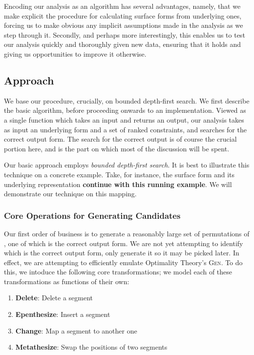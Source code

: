 \documentclass[12pt]{article}
\begin{document}
Encoding our analysis as an algorithm has several advantages, namely, that we
make explicit the procedure for calculating surface forms from underlying ones,
forcing us to make obvious any implicit assumptions made in the analysis as we
step through it. Secondly, and perhaps more interestingly, this enables us to
test our analysis quickly and thoroughly given new data, ensuring that it holds
and giving us opportunities to improve it otherwise.

\subsection{Approach}

We base our procedure, crucially, on bounded depth-first search. We first
describe the basic algorithm, before proceeding onwards to an implementation.
Viewed as a single function which takes an input and returns an output, our
analysis takes as input an underlying form and a set of ranked constraints,
and searches for the correct output form. The search for the correct output
is of course the crucial portion here, and is the part on which most of the
discussion will be spent.

Our basic approach employs \textit{bounded depth-first search}. It is best to
illustrate this technique on a concrete example. Take, for instance, the
surface form \textipa{[sol\'u]} and its underlying representation
 \textbf{continue with this running example}. We will
demonstrate our technique on this mapping.

\subsubsection{Core Operations for Generating Candidates}

Our first order of business is to generate a reasonably large set of
permutations of , one of which is the correct output form.
We are not yet attempting to identify which is the correct output form, only
generate it so it may be picked later. In effect, we are attempting to
efficiently emulate Optimality Theory's \textsc{Gen}. To do this, we intoduce
the following core transformations; we model each of these transformations as
functions of their own:

\begin{enumerate}
    \item \textbf{Delete}: Delete a segment
    \item \textbf{Epenthesize}: Insert a segment
    \item \textbf{Change}: Map a segment to another one
    \item \textbf{Metathesize}: Swap the positions of two segments
\end{enumerate}
\end{document}
